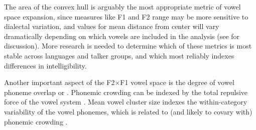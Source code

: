 The area of the convex hull is arguably the most appropriate metric of vowel space expansion, since measures like F1 and F2 range may be more sensitive to dialectal variation, and values for mean distance from center will vary dramatically depending on which vowels are included in the analysis (see \citealt{McCloyEtAl2013} for discussion).  More research is needed to determine which of these metrics is most stable across languages and talker groups, and which most reliably indexes differences in intelligibility.

Another important aspect of the F2×F1 vowel space is the degree of vowel phoneme overlap or .  Phonemic crowding can be indexed by the total repulsive force of the vowel system \citep[see][]{McCloyEtAl2013}.  Mean vowel cluster size indexes the within-category variability of the vowel phonemes, which is related to (and likely to covary with) phonemic crowding \citep{McCloyEtAl2013}.  



